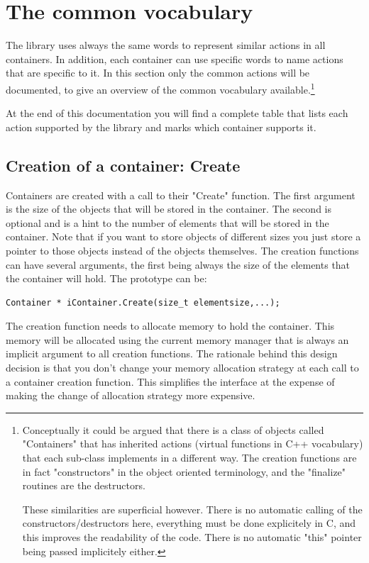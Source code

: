 \documentclass[12pt,a4paper]{memoir} %
\begin{document}
\chapter{The common vocabulary}
The library uses always the same words to represent similar actions in all containers. In addition, each container can use specific words to name actions that are specific to it. In this section only the common actions will be documented, to give an overview of the common vocabulary available.\footnote{Conceptually it could be argued that there is a class of objects called "Containers" that has inherited actions (virtual functions in C++ vocabulary) that each sub-class implements in a different way. The creation functions are in fact "constructors" in the object oriented terminology, and the "finalize" routines are the destructors. 

These similarities are superficial however. There is no automatic calling of the constructors/destructors here, everything must be done explicitely in C, and this improves the readability of the code. There is no automatic "this" pointer being passed implicitely either.}

At the end of this documentation you will find a complete table that lists each action supported by the library and marks which container supports it.

\section{Creation of a container: Create}
Containers are created with a call to their "Create" function.  The first argument is the size of the objects that will be stored in the container. The second is optional and is a hint to the number of elements that will be stored in the container.
Note that if you want to store objects of different sizes you just store a pointer to those objects instead of the objects themselves.
The creation functions can have several arguments, the first being always the size of the elements that the container will hold. The prototype can be:
\begin{verbatim}
Container * iContainer.Create(size_t elementsize,...);
\end{verbatim}
The creation function needs to allocate memory to hold the container. This memory will be allocated using the current memory manager that is always an implicit argument to all creation functions. The rationale behind this design decision is that you don't change your memory allocation strategy at each call to a container creation function. This simplifies the interface at the expense of making the change of allocation strategy more expensive.
\end{document}
